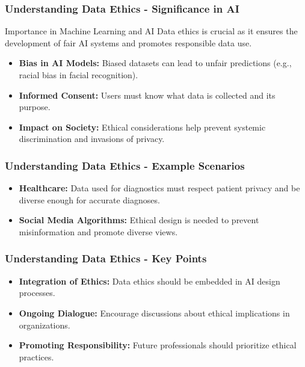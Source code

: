 \documentclass[aspectratio=169]{beamer}
\begin{document}
\begin{frame}[fragile]
    \frametitle{Understanding Data Ethics - Significance in AI}
    \begin{block}{Importance in Machine Learning and AI}
        Data ethics is crucial as it ensures the development of fair AI systems and promotes responsible data use.
    \end{block}
    \begin{itemize}
        \item \textbf{Bias in AI Models:} Biased datasets can lead to unfair predictions (e.g., racial bias in facial recognition).
        \item \textbf{Informed Consent:} Users must know what data is collected and its purpose.
        \item \textbf{Impact on Society:} Ethical considerations help prevent systemic discrimination and invasions of privacy.
    \end{itemize}
\end{frame}

\begin{frame}[fragile]
    \frametitle{Understanding Data Ethics - Example Scenarios}
    \begin{itemize}
        \item \textbf{Healthcare:} Data used for diagnostics must respect patient privacy and be diverse enough for accurate diagnoses.
        \item \textbf{Social Media Algorithms:} Ethical design is needed to prevent misinformation and promote diverse views.
    \end{itemize}
\end{frame}

\begin{frame}[fragile]
    \frametitle{Understanding Data Ethics - Key Points}
    \begin{itemize}
        \item \textbf{Integration of Ethics:} Data ethics should be embedded in AI design processes.
        \item \textbf{Ongoing Dialogue:} Encourage discussions about ethical implications in organizations.
        \item \textbf{Promoting Responsibility:} Future professionals should prioritize ethical practices.
    \end{itemize}
\end{frame}
\end{document}
